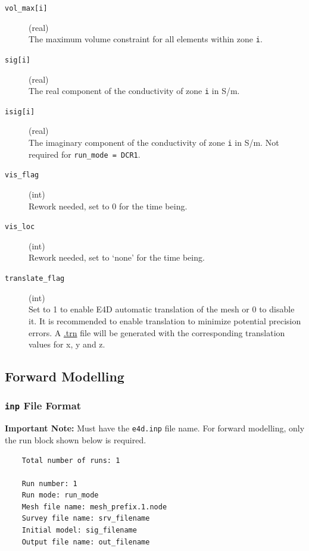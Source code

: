\documentclass[a4paper,12pt]{article}
\begin{document}
\begin{description}
    \item[\texttt{vol\_max[i]}] (real)\hfill \\
          The maximum volume constraint for all elements within zone \texttt{i}.

    \item[\texttt{sig[i]}] (real)\hfill \\
          The real component of the conductivity of zone \texttt{i} in S/m.

    \item[\texttt{isig[i]}] (real)\hfill \\
          The imaginary component of the conductivity of zone \texttt{i} in S/m. Not required for \texttt{run\_mode = DCR1}.

    \item[\texttt{vis\_flag}] (int)\hfill \\
          Rework needed, set to 0 for the time being.

    \item[\texttt{vis\_loc}] (int)\hfill \\
          Rework needed, set to `none' for the time being.

    \item[\texttt{translate\_flag}] (int)\hfill \\
          Set to 1 to enable E4D automatic translation of the mesh or 0 to disable it. It is recommended to enable translation to minimize potential precision errors. A \hyperref[mesh_trn]{.trn} file will be generated with the corresponding translation values for x, y and z.
\end{description}

\newpage
\subsection{Forward Modelling}

\subsubsection{\texttt{inp} File Format} \label{forward_inp}

\begin{framed}
    \noindent \textbf{Important Note:} Must have the \texttt{e4d.inp} file name. For forward modelling, only the run block shown below is required.
\end{framed}

\begin{framed}
    \begin{verbatim}
    Total number of runs: 1

    Run number: 1
    Run mode: run_mode
    Mesh file name: mesh_prefix.1.node
    Survey file name: srv_filename
    Initial model: sig_filename
    Output file name: out_filename
\end{verbatim}
\end{framed}
\end{document}
